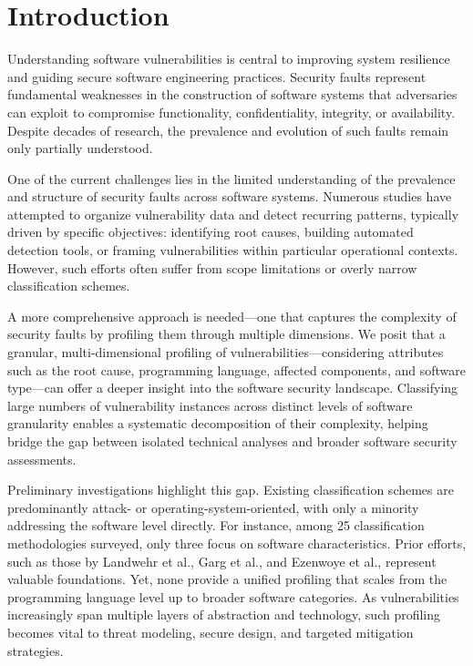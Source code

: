 \section{Introduction}

Understanding software vulnerabilities is central to improving system resilience and guiding secure software engineering practices. Security faults represent fundamental weaknesses in the construction of software systems that adversaries can exploit to compromise functionality, confidentiality, integrity, or availability. Despite decades of research, the prevalence and evolution of such faults remain only partially understood.

One of the current challenges lies in the limited understanding of the prevalence and structure of security faults across software systems. Numerous studies have attempted to organize vulnerability data and detect recurring patterns, typically driven by specific objectives: identifying root causes, building automated detection tools, or framing vulnerabilities within particular operational contexts. However, such efforts often suffer from scope limitations or overly narrow classification schemes.

A more comprehensive approach is needed—one that captures the complexity of security faults by profiling them through multiple dimensions. We posit that a granular, multi-dimensional profiling of vulnerabilities—considering attributes such as the root cause, programming language, affected components, and software type—can offer a deeper insight into the software security landscape. Classifying large numbers of vulnerability instances across distinct levels of software granularity enables a systematic decomposition of their complexity, helping bridge the gap between isolated technical analyses and broader software security assessments.

Preliminary investigations highlight this gap. Existing classification schemes are predominantly attack- or operating-system-oriented, with only a minority addressing the software level directly. For instance, among 25 classification methodologies surveyed, only three focus on software characteristics. Prior efforts, such as those by Landwehr et al., Garg et al., and Ezenwoye et al., represent valuable foundations. Yet, none provide a unified profiling that scales from the programming language level up to broader software categories. As vulnerabilities increasingly span multiple layers of abstraction and technology, such profiling becomes vital to threat modeling, secure design, and targeted mitigation strategies.

